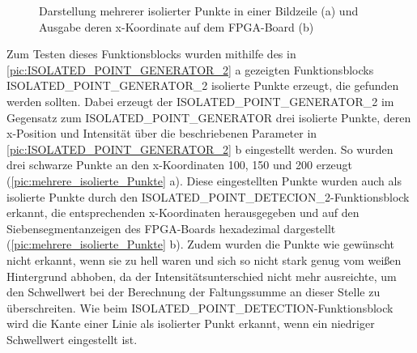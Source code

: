 \documentclass[ngerman,12pt]{article} %
\begin{document}
{\begin{figure}[h!tb]
  \centering
  \qquad
  \caption[Darstellung mehrerer isolierter Punkte in einer Bildzeile und Ausgabe deren x-Koordinate auf dem FPGA-Board]{\label{pic:mehrere_isolierte_Punkte}Darstellung mehrerer isolierter Punkte in einer Bildzeile (a) und Ausgabe deren x-Koordinate auf dem FPGA-Board (b)}
\end{figure}

Zum Testen dieses Funktionsblocks wurden mithilfe des in \autoref{pic:ISOLATED_POINT_GENERATOR_2} a gezeigten Funktionsblocks ISOLATED\_POINT\_GENERATOR\_2 isolierte Punkte erzeugt, die gefunden werden sollten. Dabei erzeugt der ISOLATED\_POINT\_GENERATOR\_2  im Gegensatz zum ISOLATED\_POINT\_GENERATOR drei isolierte Punkte, deren x-Position und Intensität über die beschriebenen Parameter in \autoref{pic:ISOLATED_POINT_GENERATOR_2} b eingestellt werden. So wurden drei schwarze Punkte an den x-Koordinaten 100, 150 und 200 erzeugt (\autoref{pic:mehrere_isolierte_Punkte} a). Diese eingestellten Punkte wurden auch als isolierte Punkte durch den ISOLATED\_POINT\_DETECION\_2-Funktionsblock erkannt, die entsprechenden x-Koordinaten herausgegeben und auf den Siebensegmentanzeigen des FPGA-Boards hexadezimal dargestellt (\autoref{pic:mehrere_isolierte_Punkte} b). Zudem wurden die Punkte wie gewünscht nicht erkannt, wenn sie zu hell waren und sich so nicht stark genug vom weißen Hintergrund abhoben, da der Intensitätsunterschied nicht mehr ausreichte, um den Schwellwert bei der Berechnung der Faltungssumme an dieser Stelle zu überschreiten. Wie beim ISOLATED\_POINT\_DETECTION-Funktionsblock wird die Kante einer Linie als isolierter Punkt erkannt, wenn ein niedriger Schwellwert eingestellt ist.

}
\end{document}
